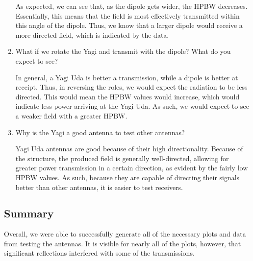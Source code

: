 \documentclass[
	letterpaper, %
	10pt, %
]{CSUniSchoolLabReport}
\begin{document}
\begin{enumerate}
    As expected, we can see that, as the dipole gets wider, the HPBW decreases. Essentially, this means that the field is most effectively transmitted within this angle of the dipole. Thus, we know that a larger dipole would receive a more directed field, which is indicated by the data.

  \item What if we rotate the Yagi and transmit with the dipole? What do you expect to see?

    In general, a Yagi Uda is better a transmission, while a dipole is better at receipt. Thus, in reversing the roles, we would expect the radiation to be less directed. This would mean the HPBW values would increase, which would indicate less power arriving at the Yagi Uda. As such, we would expect to see a weaker field with a greater HPBW.

  \item Why is the Yagi a good antenna to test other antennas?

    Yagi Uda antennas are good because of their high directionality. Because of the structure, the produced field is generally well-directed, allowing for greater power transmission in a certain direction, as evident by the fairly low HPBW values. As such, because they are capable of directing their signals better than other antennas, it is easier to test receivers.

\end{enumerate}

\subsection{Summary}

Overall, we were able to successfully generate all of the necessary plots and data from testing the antennas. It is visible for nearly all of the plots, however, that significant reflections interfered with some of the transmissions.
\end{document}
